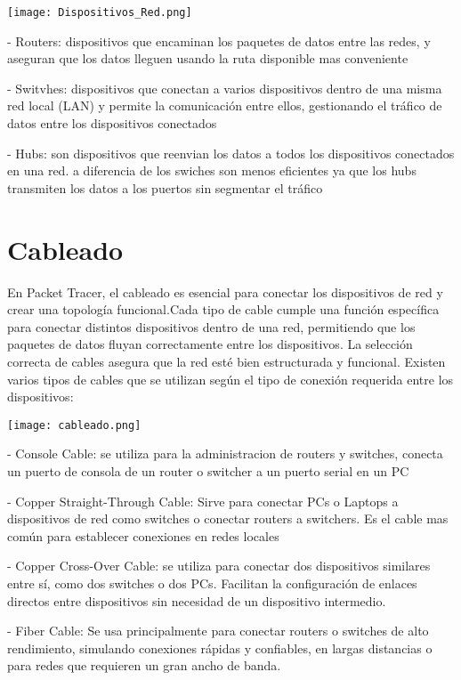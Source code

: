 \documentclass{article}
\begin{document}
\begin{center}
    \texttt{[image: Dispositivos\_Red.png]}
\end{center}

- Routers: dispositivos que encaminan los paquetes de datos entre las redes, y aseguran que los datos lleguen usando la ruta disponible mas conveniente

- Switvhes: dispositivos que conectan a varios dispositivos dentro de una misma red local (LAN) y permite la comunicación entre ellos, gestionando el tráfico de datos entre los dispositivos conectados

- Hubs: son dispositivos que reenvian los datos a todos los dispositivos conectados en una red. a diferencia de los swiches son menos eficientes ya que los hubs transmiten los datos a los puertos sin segmentar el tráfico 

\vspace{10pt}
\section{Cableado}
En Packet Tracer, el cableado es esencial para conectar los dispositivos de red y crear una topología funcional.Cada tipo de cable cumple una función específica para conectar distintos dispositivos dentro de una red, permitiendo que los paquetes de datos fluyan correctamente entre los dispositivos. La selección correcta de cables asegura que la red esté bien estructurada y funcional. Existen varios tipos de cables que se utilizan según el tipo de conexión requerida entre los dispositivos:

\begin{center}
    \texttt{[image: cableado.png]}
\end{center}

- Console Cable: se utiliza para la administracion de routers y switches, conecta un puerto de consola de un router o switcher a un puerto serial en un PC

- Copper Straight-Through Cable: Sirve para conectar PCs o Laptops a dispositivos de red como switches o conectar routers a switchers. Es el cable mas común para establecer conexiones en redes locales 

- Copper Cross-Over Cable: se utiliza para conectar dos dispositivos similares entre sí, como dos switches o dos PCs. Facilitan la configuración de enlaces directos entre dispositivos sin necesidad de un dispositivo intermedio.

- Fiber Cable: Se usa principalmente para conectar routers o switches de alto rendimiento, simulando conexiones rápidas y confiables, en largas distancias o para redes que requieren un gran ancho de banda. 
\end{document}
